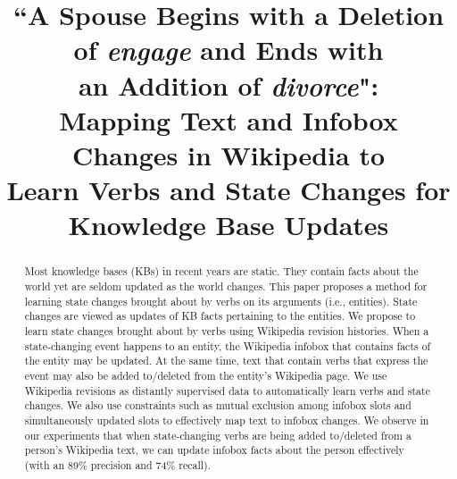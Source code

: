 \documentclass[11pt,a4paper]{article}
\title{``A Spouse Begins with a Deletion of \textit{engage} and Ends with \\an Addition of \textit{divorce}": \\Mapping Text and Infobox Changes in Wikipedia to \\Learn Verbs and State Changes for Knowledge Base Updates}
\author{%
  }
\date{}
\begin{document}
\maketitle


\begin{abstract}
Most knowledge bases (KBs) %
in recent years are static. They contain facts about the world yet are seldom updated as the world changes. This paper proposes a method for learning state changes brought about by verbs on its arguments (i.e., entities). State changes are viewed as updates of KB facts pertaining to the entities. We propose to learn state changes brought about by verbs using Wikipedia revision histories. When a state-changing event happens to an entity, the Wikipedia infobox that contains facts of the entity may be updated. At the same time, text that contain verbs that express the event may also be added to/deleted from the entity's Wikipedia page. We use Wikipedia revisions %
as distantly supervised data to automatically learn verbs and state changes. We also use %
constraints such as mutual exclusion among infobox slots and simultaneously updated slots to effectively map text to infobox changes. We observe in our experiments that when state-changing verbs are being added to/deleted from a person's Wikipedia text, we can update infobox facts about the person effectively (with an 89\% precision and 74\% recall). 

\end{abstract}








\end{document}
